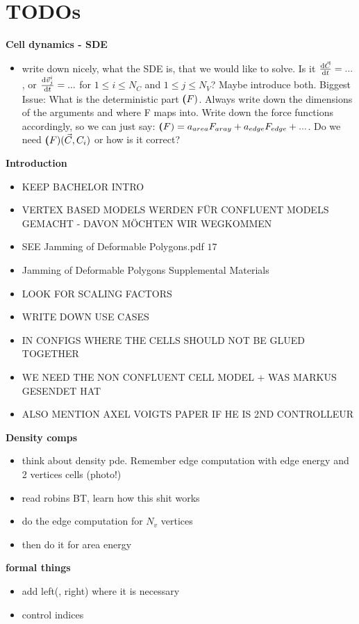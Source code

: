 \section{TODOs}

\textbf{Cell dynamics - SDE}
\begin{itemize}
    \item write down nicely, what the SDE is, that we would like to solve. Is it $\frac{\mathrm{d} \vec{C}}{\mathrm{d} t} = ... $, or $\frac{\mathrm{d} \vec{v}_j^i}{\mathrm{d} t} = ... $ for $ 1 \leq i \leq N_C$ and $1 \leq j \leq N_V$? Maybe introduce both. Biggest Issue: What is the deterministic part $\textbf(F)$. Always write down the dimensions of the arguments and where F maps into. Write down the force functions accordingly, so we can just say: $\textbf(F) = a_{area} F_{aray} + a_{edge} F_{edge} + ...$. Do we need $\textbf(F)(\vec{C}, C_i)$ or how is it correct?
\end{itemize}

\textbf{Introduction}
\begin{itemize}
    \item KEEP BACHELOR INTRO 
    \item VERTEX BASED MODELS WERDEN FÜR CONFLUENT MODELS GEMACHT - DAVON MÖCHTEN WIR WEGKOMMEN 
    \item SEE Jamming of Deformable Polygons.pdf $17$ 
    \item Jamming of Deformable Polygons Supplemental Materials
    \item LOOK FOR SCALING FACTORS
    \item WRITE DOWN USE CASES 
    \item IN CONFIGS WHERE THE CELLS SHOULD NOT BE GLUED TOGETHER
    \item WE NEED THE NON CONFLUENT CELL MODEL + WAS MARKUS GESENDET HAT 
    \item ALSO MENTION AXEL VOIGTS PAPER IF HE IS 2ND CONTROLLEUR 
\end{itemize}

\textbf{Density comps}
\begin{itemize}
    \item think about density pde. Remember edge computation with edge energy and 2 vertices cells (photo!)
    \item read robins BT, learn how this shit works 
    \item do the edge computation for $N_v$ vertices 
    \item then do it for area energy       
\end{itemize}

\textbf{formal things}
\begin{itemize}
    \item add left(, right) where it is necessary 
    \item control indices 
\end{itemize}